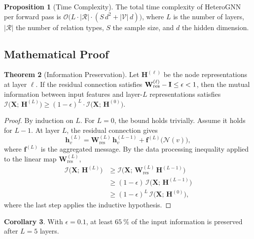 \documentclass[
    language=english,
    doctype=article,
    institution=none,
]{../../omnilatex}
\theoremstyle{definition}
\newtheorem{theorem}{Theorem}[section]
\newtheorem{proposition}[theorem]{Proposition}
\newtheorem{corollary}[theorem]{Corollary}
\theoremstyle{definition}
\theoremstyle{remark}
\newcommand{\mat}[1]{\mathbf{#1}}
\begin{document}
\begin{proposition}[Time Complexity]
    \label{prop:complexity}
    The total time complexity of HeteroGNN per forward pass is
    \(\mathcal{O}\bigl(L \cdot |\mathcal{R}| \cdot (S\,d^2 + |\mathcal{V}|\,d)\bigr)\),
    where \(L\) is the number of layers, \(|\mathcal{R}|\) the number of
    relation types, \(S\) the sample size, and \(d\) the hidden dimension.
\end{proposition}

\subsection{Mathematical Proof}

\begin{theorem}[Information Preservation]
    \label{thm:info-preserve}
    Let \(\mat{H}^{(\ell)}\) be the node representations at layer \(\ell\).
    If the residual connection satisfies
    \(\norm{\mat{W}_{\text{res}}^{(\ell)} - \mat{I}} \le \epsilon < 1\),
    then the mutual information between input features and layer-\(L\)
    representations satisfies
    \(\mathcal{I}\bigl(\mat{X};\,\mat{H}^{(L)}\bigr)
        \ge (1-\epsilon)^L \cdot \mathcal{I}\bigl(\mat{X};\,\mat{H}^{(0)}\bigr)\).
\end{theorem}

\begin{proof}
    By induction on \(L\).  For \(L=0\), the bound holds trivially.
    Assume it holds for \(L-1\).  At layer \(L\), the residual connection
    gives
    \[
        \mat{h}_v^{(L)}
            = \mat{W}_{\text{res}}^{(L)}\,\mat{h}_v^{(L-1)}
              + \mat{f}^{(L)}\!\bigl(\mathcal{N}(v)\bigr),
    \]
    where \(\mat{f}^{(L)}\) is the aggregated message.  By the data
    processing inequality applied to the linear map
    \(\mat{W}_{\text{res}}^{(L)}\),
    \begin{align}
        \mathcal{I}\bigl(\mat{X};\,\mat{H}^{(L)}\bigr)
            &\ge \mathcal{I}\bigl(\mat{X};\,
               \mat{W}_{\text{res}}^{(L)}\,\mat{H}^{(L-1)}\bigr) \\
            &\ge (1-\epsilon)\,\mathcal{I}\bigl(\mat{X};\,\mat{H}^{(L-1)}\bigr) \\
            &\ge (1-\epsilon)^L\,\mathcal{I}\bigl(\mat{X};\,\mat{H}^{(0)}\bigr),
    \end{align}
    where the last step applies the inductive hypothesis.
\end{proof}

\begin{corollary}
    \label{cor:residual-depth}
    With \(\epsilon = 0.1\), at least \(\SI{65}{\percent}\) of the input
    information is preserved after \(L=5\) layers.
\end{corollary}
\end{document}
